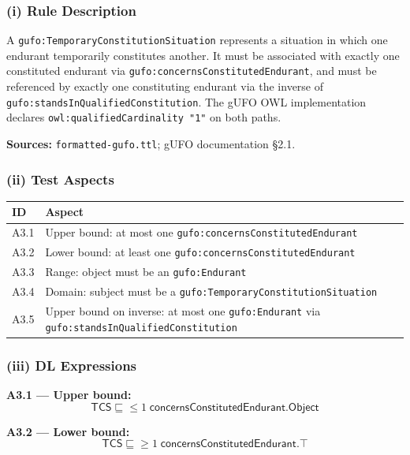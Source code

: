 \documentclass[12pt,a4paper]{article}
\newcommand{\gufoclass}[1]{\nolinkurl{gufo:#1}}
\newcommand{\gufoprop}[1]{\nolinkurl{gufo:#1}}
\begin{document}
\subsubsection*{(i) Rule Description}

A \gufoclass{TemporaryConstitutionSituation} represents a situation in which one
endurant temporarily constitutes another. It must be associated with exactly one
constituted endurant via \gufoprop{concernsConstitutedEndurant}, and must be
referenced by exactly one constituting endurant via the inverse of
\gufoprop{standsInQualifiedConstitution}. The gUFO OWL implementation declares
\nolinkurl{owl:qualifiedCardinality "1"} on both paths.

\textbf{Sources:} \texttt{formatted-gufo.ttl}; gUFO documentation \S2.1.

\subsubsection*{(ii) Test Aspects}

\begin{tabular}{lL{9.5cm}}
  \toprule
  \textbf{ID} & \textbf{Aspect} \\
  \midrule
  A3.1 & Upper bound: at most one \gufoprop{concernsConstitutedEndurant} \\
  A3.2 & Lower bound: at least one \gufoprop{concernsConstitutedEndurant} \\
  A3.3 & Range: object must be an \gufoclass{Endurant} \\
  A3.4 & Domain: subject must be a \gufoclass{TemporaryConstitutionSituation} \\
  A3.5 & Upper bound on inverse: at most one \gufoclass{Endurant} via
         \gufoprop{standsInQualifiedConstitution} \\
  \bottomrule
\end{tabular}

\subsubsection*{(iii) DL Expressions}

\textbf{A3.1 --- Upper bound:}
\begin{equation*}
  \mathsf{TCS} \sqsubseteq {\leq}1\;\mathsf{concernsConstitutedEndurant}.\mathsf{Object}
\end{equation*}

\textbf{A3.2 --- Lower bound:}
\begin{equation*}
  \mathsf{TCS} \sqsubseteq {\geq}1\;\mathsf{concernsConstitutedEndurant}.\top
\end{equation*}
\end{document}

